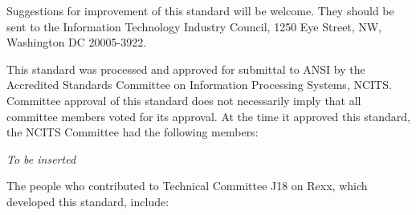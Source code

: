 Suggestions for improvement of this standard will be welcome. They
should be sent to the Information Technology Industry Council, 1250 Eye
Street, NW, Washington DC 20005-3922.

This standard was processed and approved for submittal to ANSI by the
Accredited Standards Committee on Information Processing Systems, NCITS.
Committee approval of this standard does not necessarily imply that all
committee members voted for its approval. At the time it approved this
standard, the NCITS Committee had the following members:

\emph{To be inserted}

The people who contributed to Technical Committee J18 on Rexx, which
developed this standard, include:
